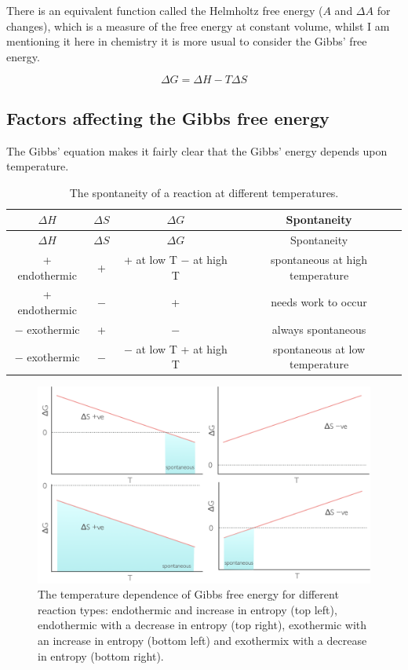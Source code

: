 \documentclass[
]{book}
\begin{document}
There is an equivalent function called the Helmholtz free energy (\(A\) and \(\Delta A\) for changes), which is a measure of the free energy at constant volume, whilst I am mentioning it here in chemistry it is more usual to consider the Gibbs' free energy.

\begin{equation}
\Delta G = \Delta H - T \Delta S
\label{eq:Helmholtz}
\end{equation}

\hypertarget{factors-affecting-the-gibbs-free-energy}{%
\subsection{Factors affecting the Gibbs free energy}\label{factors-affecting-the-gibbs-free-energy}}

The Gibbs' equation makes it fairly clear that the Gibbs' energy depends upon temperature.

\begin{longtable}[]{@{}cccc@{}}
\caption{\label{tab:Gibbstemp} The spontaneity of a reaction at different temperatures.}\tabularnewline
\toprule
\(\Delta H\) & \(\Delta S\) & \(\Delta G\) & Spontaneity\tabularnewline
\midrule
\endfirsthead
\toprule
\(\Delta H\) & \(\Delta S\) & \(\Delta G\) & Spontaneity\tabularnewline
\midrule
\endhead
+ endothermic & + & + at low T − at high T & spontaneous at high temperature\tabularnewline
+ endothermic & − & + & needs work to occur\tabularnewline
− exothermic & + & − & always spontaneous\tabularnewline
− exothermic & − & − at low T + at high T & spontaneous at low temperature\tabularnewline
\bottomrule
\end{longtable}

\begin{figure}

{\centering \includegraphics[width=0.8\linewidth]{images/Gibbstemp} 

}

\caption{The temperature dependence of Gibbs free energy for different reaction types: endothermic and increase in entropy (top left), endothermic with a decrease in entropy (top right), exothermic with an increase in entropy (bottom left) and exothermix with a decrease in entropy (bottom right).}\label{fig:Gibbstemp}
\end{figure}
\end{document}
